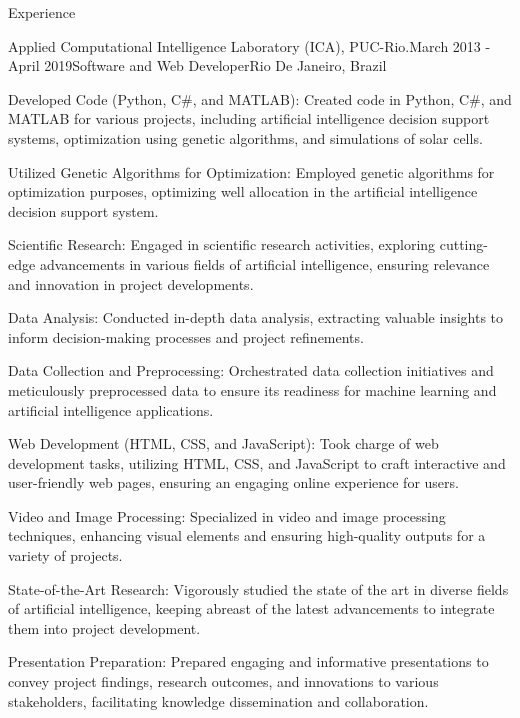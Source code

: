 \documentclass{resume} %
\begin{document}
\begin{rSection}{Experience}
        \begin{rSubsection}{Applied Computational Intelligence Laboratory (ICA), PUC-Rio.}{March  2013 - April 2019}{Software and Web Developer}{Rio De Janeiro, Brazil}
            {\normalfont 
            \item Developed Code (Python, C\#, and MATLAB): Created code in Python, C\#, and MATLAB for various projects, including artificial intelligence decision support systems, optimization using genetic algorithms, and simulations of solar cells.
            \item Utilized Genetic Algorithms for Optimization: Employed genetic algorithms for optimization purposes, optimizing well allocation in the artificial intelligence decision support system.
            \item Scientific Research: Engaged in scientific research activities, exploring cutting-edge advancements in various fields of artificial intelligence, ensuring relevance and innovation in project developments.
            \item Data Analysis: Conducted in-depth data analysis, extracting valuable insights to inform decision-making processes and project refinements.
            \item Data Collection and Preprocessing: Orchestrated data collection initiatives and meticulously preprocessed data to ensure its readiness for machine learning and artificial intelligence applications.
            \item Web Development (HTML, CSS, and JavaScript): Took charge of web development tasks, utilizing HTML, CSS, and JavaScript to craft interactive and user-friendly web pages, ensuring an engaging online experience for users.
            \item Video and Image Processing: Specialized in video and image processing techniques, enhancing visual elements and ensuring high-quality outputs for a variety of projects.
            \item State-of-the-Art Research: Vigorously studied the state of the art in diverse fields of artificial intelligence, keeping abreast of the latest advancements to integrate them into project development.
            \item Presentation Preparation: Prepared engaging and informative presentations to convey project findings, research outcomes, and innovations to various stakeholders, facilitating knowledge dissemination and collaboration.
            }
        \end{rSubsection}


\end{rSection}
\end{document}
